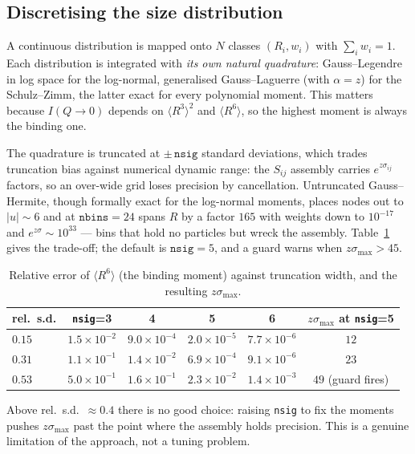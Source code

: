 \documentclass[11pt,a4paper]{article}
\newcommand{\code}[1]{\texttt{#1}}
\begin{document}
\subsection{Discretising the size distribution}

A continuous distribution is mapped onto $N$ classes $(R_i,w_i)$ with
$\sum_iw_i=1$. Each distribution is integrated with \emph{its own natural
quadrature}: Gauss--Legendre in log space for the log-normal, generalised
Gauss--Laguerre (with $\alpha=z$) for the Schulz--Zimm, the latter exact for
every polynomial moment. This matters because $I(Q\to0)$ depends on
$\langle R^3\rangle^2$ and $\langle R^6\rangle$, so the highest moment is
always the binding one.

The quadrature is truncated at $\pm\,\code{nsig}$ standard deviations, which
trades truncation bias against numerical dynamic range: the $S_{ij}$ assembly
carries $e^{z\sigma_{ij}}$ factors, so an over-wide grid loses precision by
cancellation. Untruncated Gauss--Hermite, though formally exact for the
log-normal moments, places nodes out to $|u|\sim6$ and at
$\code{nbins}=24$ spans $R$ by a factor $165$ with weights down to $10^{-17}$
and $e^{z\sigma}\sim10^{33}$ --- bins that hold no particles but wreck the
assembly. Table~\ref{tab:nsig} gives the trade-off; the default is
$\code{nsig}=5$, and a guard warns when $z\sigma_{\max}>45$.

\begin{table}[htbp]
\centering\small
\caption{Relative error of $\langle R^6\rangle$ (the binding moment) against
truncation width, and the resulting $z\sigma_{\max}$.}
\label{tab:nsig}
\begin{tabular}{@{}lccccc@{}}
\toprule
rel.\ s.d. & \code{nsig}=3 & 4 & 5 & 6 & $z\sigma_{\max}$ at \code{nsig}=5\\
\midrule
$0.15$ & $1.5\times10^{-2}$ & $9.0\times10^{-4}$ & $2.0\times10^{-5}$ & $7.7\times10^{-6}$ & $12$\\
$0.31$ & $1.1\times10^{-1}$ & $1.4\times10^{-2}$ & $6.9\times10^{-4}$ & $9.1\times10^{-6}$ & $23$\\
$0.53$ & $5.0\times10^{-1}$ & $1.6\times10^{-1}$ & $2.3\times10^{-2}$ & $1.4\times10^{-3}$ & $49$ (guard fires)\\
\bottomrule
\end{tabular}
\end{table}

Above rel.\ s.d.\ $\approx0.4$ there is no good choice: raising \code{nsig} to
fix the moments pushes $z\sigma_{\max}$ past the point where the assembly holds
precision. This is a genuine limitation of the approach, not a tuning problem.
\end{document}
